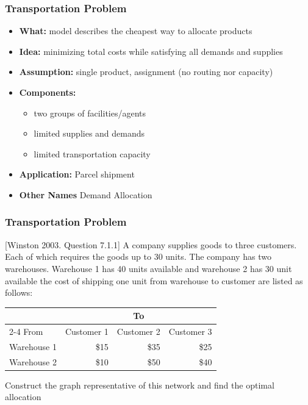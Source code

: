 \documentclass[10pt,handout,notes=show]{beamer}
\begin{document}
\begin{frame}
  \frametitle{Transportation Problem  }

  \begin{itemize}
    \item \textbf{What:} model describes the cheapest way to  \alert{allocate} products
    \item \textbf{Idea:} minimizing total costs while satisfying all demands and supplies
    \item \textbf{Assumption:} \alert{single product}, \alert{assignment} (no routing nor capacity)
    \item \textbf{Components:}
    \begin{itemize}
        \item two groups of facilities/agents
        \item limited supplies and demands
        \item limited transportation capacity \NextLine
    \end{itemize}
    \item \textbf{Application:} Parcel shipment
    \item \textbf{Other Names} Demand Allocation
  \end{itemize}


\end{frame}

\begin{frame}
  \frametitle{Transportation Problem  }

  \small{ [Winston 2003. Question 7.1.1] A company supplies goods to three customers. Each of which requires the goods up to 30 units. The company has two warehouses. Warehouse 1 has 40 units available and warehouse 2 has 30 unit available the cost of shipping one unit from warehouse to customer are listed as follows:
  \begin{center}
  \begin{tabular}{lrrr} \hline
        ~ & \multicolumn{3}{c}{To} \\ \cline{2-4}
    From        & Customer 1  & Customer 2  & Customer 3 \\ \hline
    Warehouse 1 & \$15 & \$35 & \$25 \\
    Warehouse 2 & \$10 & \$50 & \$40 \\ \hline
  \end{tabular}
  \end{center}
  Construct the graph representative of this network and find the optimal allocation
  }

  \note{
    \begin{itemize}
      \item
    \end{itemize}
  }
\end{frame}
\end{document}
